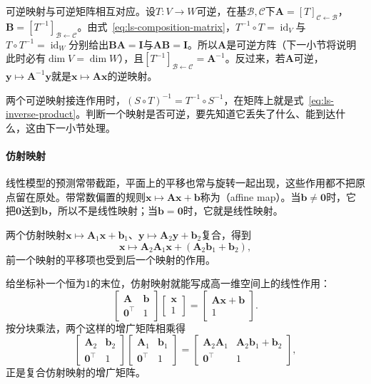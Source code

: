 可逆映射与可逆矩阵相互对应。设$T:V\to W$可逆，在基$\mathcal B,\mathcal C$下$\bm A=[T]_{\mathcal C\leftarrow\mathcal B}$，$\bm B=[T^{-1}]_{\mathcal B\leftarrow\mathcal C}$。由式~\eqref{eq:ls-composition-matrix}，$T^{-1}\circ T=\operatorname{id}_V$与$T\circ T^{-1}=\operatorname{id}_W$分别给出$\bm B\bm A=\bm I$与$\bm A\bm B=\bm I$。所以$\bm A$是可逆方阵（下一小节将说明此时必有$\dim V=\dim W$），且$[T^{-1}]_{\mathcal B\leftarrow\mathcal C}=\bm A^{-1}$。反过来，若$\bm A$可逆，$\bm y\mapsto\bm A^{-1}\bm y$就是$\bm x\mapsto\bm A\bm x$的逆映射。

两个可逆映射接连作用时，$(S\circ T)^{-1}=T^{-1}\circ S^{-1}$，在矩阵上就是式~\eqref{eq:ls-inverse-product}。判断一个映射是否可逆，要先知道它丢失了什么、能到达什么，这由下一小节处理。

\paragraph{仿射映射}
\label{sec:ls-affine-maps}
线性模型的预测常带截距，平面上的平移也常与旋转一起出现，这些作用都不把原点留在原处。带常数偏置的规则$\bm x\mapsto\bm A\bm x+\bm b$称为（affine map）。当$\bm b\neq\bm0$时，它把$\bm0$送到$\bm b$，所以不是线性映射；当$\bm b=\bm0$时，它就是线性映射。

两个仿射映射$\bm x\mapsto\bm A_1\bm x+\bm b_1$、$\bm y\mapsto\bm A_2\bm y+\bm b_2$复合，得到
\[
 \bm x\mapsto\bm A_2\bm A_1\bm x+(\bm A_2\bm b_1+\bm b_2),
\]
前一个映射的平移项也受到后一个映射的作用。

给坐标补一个恒为$1$的末位，仿射映射就能写成高一维空间上的线性作用：
\begin{equation}
 \begin{bmatrix}\bm A&\bm b\\ \bm0^\top&1\end{bmatrix}
 \begin{bmatrix}\bm x\\1\end{bmatrix}
 =
 \begin{bmatrix}\bm A\bm x+\bm b\\1\end{bmatrix}.
 \label{eq:ls-affine-homogeneous}
\end{equation}
按分块乘法，两个这样的增广矩阵相乘得
\[
 \begin{bmatrix}\bm A_2&\bm b_2\\ \bm0^\top&1\end{bmatrix}
 \begin{bmatrix}\bm A_1&\bm b_1\\ \bm0^\top&1\end{bmatrix}
 =\begin{bmatrix}\bm A_2\bm A_1&\bm A_2\bm b_1+\bm b_2\\ \bm0^\top&1\end{bmatrix},
\]
正是复合仿射映射的增广矩阵。


